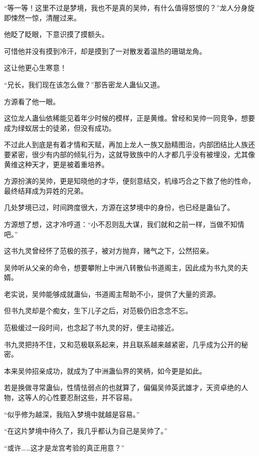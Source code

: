 
\begin{this_body}

“等一等！这里不过是梦境，我也不是真的吴帅，有什么值得怒恨的？”龙人分身旋即悚然一惊，清醒过来。

他眨了眨眼，下意识摸了摸额头。

可惜他并没有摸到冷汗，却是摸到了一对散发着温热的珊瑚龙角。

这让他更心生寒意！

“兄长，我们现在该怎么做？”那告密龙人蛊仙又道。

方源看了他一眼。

这位龙人蛊仙依稀能见着年少时候的模样，正是黄维。曾经和吴帅一同竞争，想要成为绿蚁居士的徒弟，但没有成功。

不过此人到底是有着才情和天赋，再加上龙人一族又励精图治，内部团结比人族还要紧密，很少有内部的倾轧行为，这就导致族中的人才都几乎没有被埋没，尤其像黄维这种天才，更是被着重培养。

方源扮演的吴帅，更是知晓他的才华，便刻意结交，机缘巧合之下救了他的性命，最终结拜成为异姓的兄弟。

几处梦境已过，时间跨度很大，方源在这梦境中的身份，也已经是蛊仙了。

方源想了想，这才冷哼道：“小不忍则乱大谋，我们就和之前一样，当做不知情吧。”

这书九灵曾经怀了范极的孩子，被对方抛弃，赌气之下，公然招亲。

吴帅听从父亲的命令，想要攀附上中洲八转散仙书道阁主，因此成为书九灵的夫婿。

老实说，吴帅能够成就蛊仙，书道阁主帮助不小，提供了大量的资源。

但书九灵却是个痴女，生下儿子之后，对范极仍旧念念不忘。

范极缓过一段时间，也念起了书九灵的好，便主动接近。

书九灵把持不住，又和范极联系起来，并且联系越来越紧密，几乎成为公开的秘密。

本来吴帅招亲成功，就成为了中洲蛊仙界的笑柄，如今更是如此。

若是换做寻常蛊仙，性情怯弱点的也就算了，偏偏吴帅英武雄才，天资卓绝的人物，这等人的心性要忍耐这些，并不容易。

“似乎修为越深，我陷入梦境中就越是容易。”

“在这片梦境中待久了，我几乎都认为自己是吴帅了。”

“或许……这才是龙宫考验的真正用意？”


\end{this_body}
